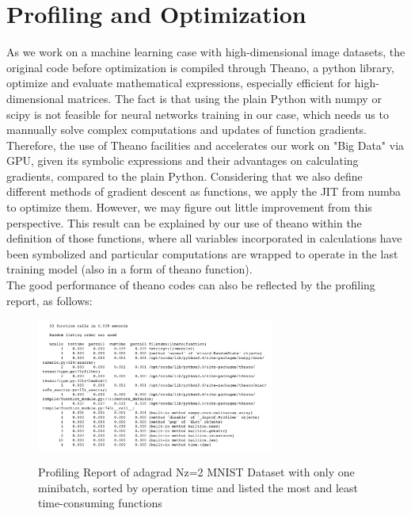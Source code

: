 \documentclass[11pt]{article}
\begin{document}
\section{Profiling and Optimization}
As we work on a machine learning case with high-dimensional image datasets, the original code before optimization is compiled through Theano, a python library, optimize and evaluate mathematical expressions, especially efficient for high-dimensional matrices. The fact is that using the plain Python with numpy or scipy is not feasible for neural networks training in our case, which needs us to mannually solve complex computations and updates of function gradients. Therefore, the use of Theano facilities and accelerates our work on "Big Data" via GPU, given its symbolic expressions and their advantages on calculating gradients, compared to the plain Python. Considering that we also define different methods of gradient descent as functions, we apply the JIT from numba to optimize them. However, we may figure out little improvement from this perspective. This result can be explained by our use of theano within the definition of those functions, where all variables incorporated in calculations have been symbolized and particular computations are wrapped to operate in the last training model (also in a form of theano function).\\

The good performance of theano codes can also be reflected by the profiling report, as follows:

\begin{figure}[H]
\begin{center}
\includegraphics[width = 0.7\textwidth]{fig/profile2}\\
\caption{Profiling Report of adagrad Nz=2 MNIST Dataset with only one minibatch, sorted by operation time and listed the most and least time-consuming functions}
\end{center}
\end{figure}
\end{document}
